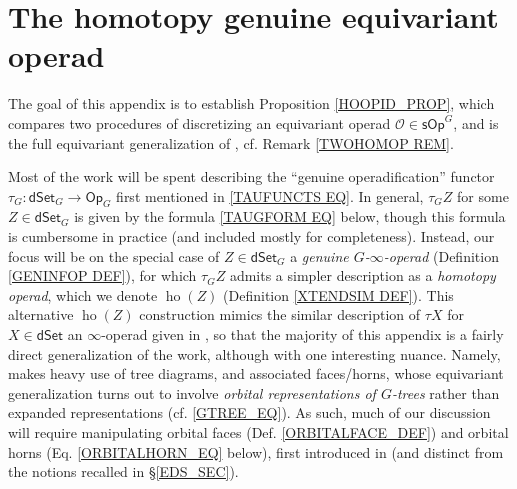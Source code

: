 \documentclass[a4paper,10pt
,draft
]{article}%
\numberwithin{equation}{section}
\numberwithin{figure}{section}
\theoremstyle{definition} %
\newtheorem{definition}[equation]{Definition}%
\renewcommand{\O}{\ensuremath{\mathcal O}}
\newcommand{\1}{\ensuremath{\mathbbm 1}}%
\begin{document}
\appendix





\section{The homotopy genuine equivariant operad}
\label{HGEO AP}



The goal of this appendix is to establish
Proposition \ref{HOOPID_PROP},
which compares two procedures of discretizing 
an equivariant operad $\O \in \mathsf{sOp}^G$,
and is the full equivariant generalization of
\cite[Prop. 4.8]{CM13b},
cf. Remark \ref{TWOHOMOP REM}.

Most of the work will be spent 
describing the ``genuine operadification'' functor
$\tau_G \colon \mathsf{dSet}_G \to \mathsf{Op}_G$
first mentioned in
\eqref{TAUFUNCTS EQ}.
In general, $\tau_G Z$ for some $Z \in \mathsf{dSet}_G$
is given by the formula 
\eqref{TAUGFORM EQ} below,
though this formula is cumbersome in practice
(and included mostly for completeness).
Instead, our focus will be on the special case of
$Z \in \mathsf{dSet}_G$
a \emph{genuine $G$-$\infty$-operad}
(Definition \ref{GENINFOP DEF}),
for which $\tau_G Z$ admits a simpler description as a 
\emph{homotopy operad}, 
which we denote
$\mathop{\mathrm{ho}}(Z)$ (Definition \ref{XTENDSIM DEF}).
%
This alternative $\mathop{\mathrm{ho}}(Z)$
construction mimics the similar description 
of $\tau X$ for $X\in \mathsf{dSet}$
an $\infty$-operad given in \cite[\S 6]{MW09},
so that the majority of this appendix is a fairly direct generalization of the work, 
although with one interesting nuance.
Namely, \cite[\S 6]{MW09} makes heavy use of tree diagrams,  
and associated faces/horns, 
whose equivariant generalization turns out to involve
\emph{orbital representations of $G$-trees}
rather than expanded representations
(cf. \eqref{GTREE_EQ}).
As such, much of our discussion will require manipulating orbital faces (Def. \ref{ORBITALFACE_DEF}) and
orbital horns (Eq. \eqref{ORBITALHORN_EQ} below),
first introduced in
\cite[\S2.2,\S2.3]{BP_edss}
(and distinct from the notions recalled in 
\S \ref{EDS_SEC}).



\end{document}
